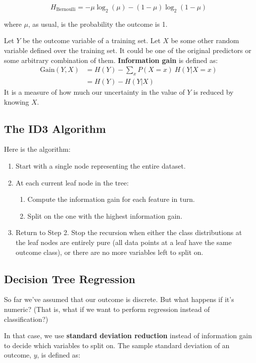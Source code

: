 $$ H_\text{Bernoulli} = -\mu \log_2(\mu) - (1 - \mu) \log_2 (1 - \mu) $$

where $\mu$, as usual, is the probability the outcome is 1. 

Let $Y$ be the outcome variable of a training set. Let $X$ be some other random variable defined over the training set. It could be one of the original predictors or some arbitrary combination of them. \textbf{Information gain} is defined as:
\begin{align*} \text{Gain}(Y, X) &= H(Y) - \sum_{x} P(X = x)~ H(Y|X=x) \\
&= H(Y) - H(Y|X) \end{align*}
It is a measure of how much our uncertainty in the value of $Y$ is reduced by knowing $X$. 

\subsection{The ID3 Algorithm}

Here is the algorithm:
\begin{enumerate}
\item Start with a single node representing the entire dataset.
\item At each current leaf node in the tree:
\begin{enumerate}
\item Compute the information gain for each feature in turn.
\item Split on the one with the highest information gain.
\end{enumerate}
\item Return to Step 2. Stop the recursion when either the class distributions at the leaf nodes are entirely pure (all data points at a leaf have the same outcome class), or there are no more variables left to split on.
\end{enumerate}

\subsection{Decision Tree Regression}

So far we've assumed that our outcome is discrete. But what happens if it's numeric? (That is, what if we want to perform regression instead of classification?)

In that case, we use \textbf{standard deviation reduction} instead of information gain to decide which variables to split on. The sample standard deviation of an outcome, $y$, is defined as:


